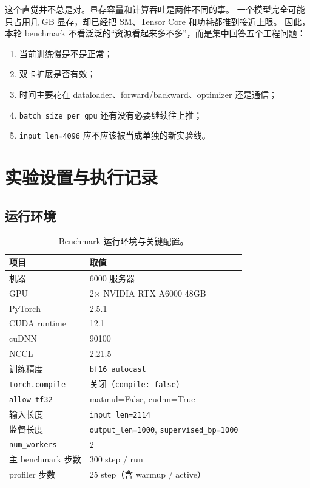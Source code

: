 \documentclass[11pt,a4paper]{ctexart}
\begin{document}
这个直觉并不总是对。显存容量和计算吞吐是两件不同的事。
一个模型完全可能只占用几 GB 显存，却已经把 SM、Tensor Core 和功耗都推到接近上限。
因此，本轮 benchmark 不看泛泛的“资源看起来多不多”，而是集中回答五个工程问题：
\begin{enumerate}[leftmargin=2em]
  \item 当前训练慢是不是正常；
  \item 双卡扩展是否有效；
  \item 时间主要花在 dataloader、forward/backward、optimizer 还是通信；
  \item \texttt{batch\_size\_per\_gpu} 还有没有必要继续往上推；
  \item \texttt{input\_len=4096} 应不应该被当成单独的新实验线。
\end{enumerate}

\section{实验设置与执行记录}

\subsection{运行环境}

\begin{table}[H]
\centering
\small
\caption{Benchmark 运行环境与关键配置。}
\begin{tabular}{ll}
\toprule
项目 & 取值 \\
\midrule
机器 & 6000 服务器 \\
GPU & 2$\times$ NVIDIA RTX A6000 48GB \\
PyTorch & 2.5.1 \\
CUDA runtime & 12.1 \\
cuDNN & 90100 \\
NCCL & 2.21.5 \\
训练精度 & \texttt{bf16 autocast} \\
\texttt{torch.compile} & 关闭（\texttt{compile: false}） \\
\texttt{allow\_tf32} & matmul=False, cudnn=True \\
输入长度 & \texttt{input\_len=2114} \\
监督长度 & \texttt{output\_len=1000}, \texttt{supervised\_bp=1000} \\
\texttt{num\_workers} & 2 \\
主 benchmark 步数 & 300 step / run \\
profiler 步数 & 25 step（含 warmup / active） \\
\bottomrule
\end{tabular}
\end{table}
\end{document}

